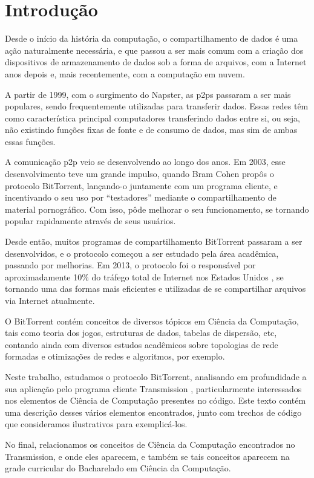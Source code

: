 
\chapter{Introdução}

Desde o início da história da computação, o compartilhamento de dados é uma ação
naturalmente necessária, e que passou a ser mais comum com a criação dos dispositivos de
armazenamento de dados sob a forma de arquivos, com a Internet anos depois e, mais
recentemente, com a computação em nuvem.

A partir de 1999, com o surgimento do Napster, as \glspl{p2p} passaram a ser mais
populares, sendo frequentemente utilizadas para transferir dados. Essas redes têm como
característica principal computadores transferindo dados entre si, ou seja, não
existindo funções fixas de fonte e de consumo de dados, mas sim de ambas essas funções.

A comunicação \gls*{p2p} veio se desenvolvendo ao longo dos anos. Em 2003, esse
desenvolvimento teve um grande impulso, quando Bram Cohen propôs o protocolo BitTorrent,
lançando-o juntamente com um programa cliente, e incentivando o seu uso por
``testadores'' mediante o compartilhamento de material pornográfico. Com isso, pôde
melhorar o seu funcionamento, se tornando popular rapidamente através de seus usuários.

Desde então, muitos programas de compartilhamento BitTorrent passaram a ser
desenvolvidos, e o protocolo começou a ser estudado pela área acadêmica, passando por
melhorias. Em 2013, o protocolo foi o responsável por aproximadamente 10\% do tráfego
total de Internet nos Estados Unidos \cite{report:internet-usage-2013}, se tornando uma
das formas mais eficientes e utilizadas de se compartilhar arquivos via Internet
atualmente.

O BitTorrent contém conceitos de diversos tópicos em Ciência da Computação, tais como
teoria dos jogos, estruturas de dados, tabelas de dispersão, etc, contando ainda com
diversos estudos acadêmicos sobre topologias de rede formadas e otimizações de redes e
algoritmos, por exemplo.

Neste trabalho, estudamos o protocolo BitTorrent, analisando em profundidade a sua
aplicação pelo programa cliente Transmission \cite{site:transmission}, particularmente
interessados nos elementos de Ciência de Computação presentes no código. Este texto
contém uma descrição desses vários elementos encontrados, junto com trechos de código
que consideramos ilustrativos para exemplicá-los.

No final, relacionamos os conceitos de Ciência da Computação encontrados no
Transmission, e onde eles aparecem, e também se tais conceitos aparecem na grade
curricular do Bacharelado em Ciência da Computação.

\afterpage{\clearpage}